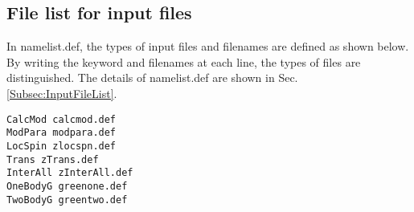 \subsection{File list for input files}
In namelist.def, the types of input files and filenames are defined as shown below.
By writing the keyword and filenames at each line, the types of files are distinguished.
The details of namelist.def are shown in Sec. \ref{Subsec:InputFileList}.
\\
\begin{minipage}{15cm}
\begin{screen}
\begin{verbatim}
CalcMod calcmod.def
ModPara modpara.def
LocSpin zlocspn.def
Trans zTrans.def
InterAll zInterAll.def
OneBodyG greenone.def
TwoBodyG greentwo.def
\end{verbatim}
\end{screen}
\end{minipage}

